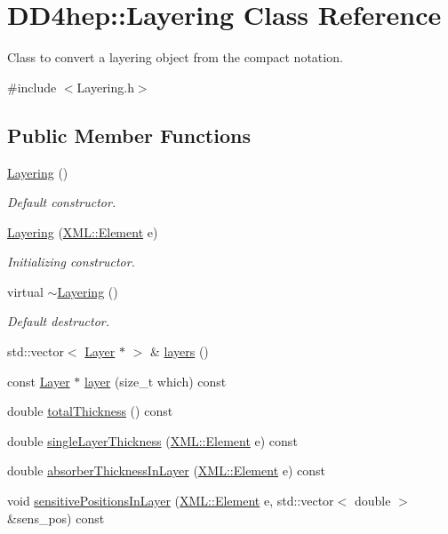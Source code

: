 \hypertarget{class_d_d4hep_1_1_layering}{
\section{DD4hep::Layering Class Reference}
\label{class_d_d4hep_1_1_layering}
}


Class to convert a layering object from the compact notation.  


{\ttfamily \#include $<$Layering.h$>$}\subsection*{Public Member Functions}
\begin{DoxyCompactItemize}
\item 
\hyperlink{class_d_d4hep_1_1_layering_aece09b62f4026ce23f6077fb677458ea}{Layering} ()
\begin{DoxyCompactList}\small\item\em Default constructor. \item\end{DoxyCompactList}\item 
\hyperlink{class_d_d4hep_1_1_layering_a0184f98f114c11134ac13ae521400dcc}{Layering} (\hyperlink{class_d_d4hep_1_1_x_m_l_1_1_element}{XML::Element} e)
\begin{DoxyCompactList}\small\item\em Initializing constructor. \item\end{DoxyCompactList}\item 
virtual \hyperlink{class_d_d4hep_1_1_layering_a4b562fdcbadab7a0bb09121c53949335}{$\sim$Layering} ()
\begin{DoxyCompactList}\small\item\em Default destructor. \item\end{DoxyCompactList}\item 
std::vector$<$ \hyperlink{class_d_d4hep_1_1_layer}{Layer} $\ast$ $>$ \& \hyperlink{class_d_d4hep_1_1_layering_ab6b0103b1e2d3f16f3a423e9cf73c32b}{layers} ()
\item 
const \hyperlink{class_d_d4hep_1_1_layer}{Layer} $\ast$ \hyperlink{class_d_d4hep_1_1_layering_acf360b377854308441871459f88552d4}{layer} (size\_\-t which) const 
\item 
double \hyperlink{class_d_d4hep_1_1_layering_a374decca74d33a2210637096fef9f23e}{totalThickness} () const 
\item 
double \hyperlink{class_d_d4hep_1_1_layering_a74a4fb01a9bea82276a74462d345e8a3}{singleLayerThickness} (\hyperlink{class_d_d4hep_1_1_x_m_l_1_1_element}{XML::Element} e) const 
\item 
double \hyperlink{class_d_d4hep_1_1_layering_a1c68ff25462a99628e02118a0647b9e7}{absorberThicknessInLayer} (\hyperlink{class_d_d4hep_1_1_x_m_l_1_1_element}{XML::Element} e) const 
\item 
void \hyperlink{class_d_d4hep_1_1_layering_a56a4015dcdc9ca84881ad84610744451}{sensitivePositionsInLayer} (\hyperlink{class_d_d4hep_1_1_x_m_l_1_1_element}{XML::Element} e, std::vector$<$ double $>$ \&sens\_\-pos) const 
\end{DoxyCompactItemize}
